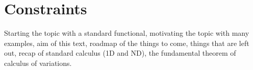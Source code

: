 \section{Constraints}
Starting the topic with a standard functional, motivating the topic with many examples, aim of this text, roadmap of the things to come, things that are left out, recap of standard calculus (1D and ND), the fundamental theorem of calculus of variations.